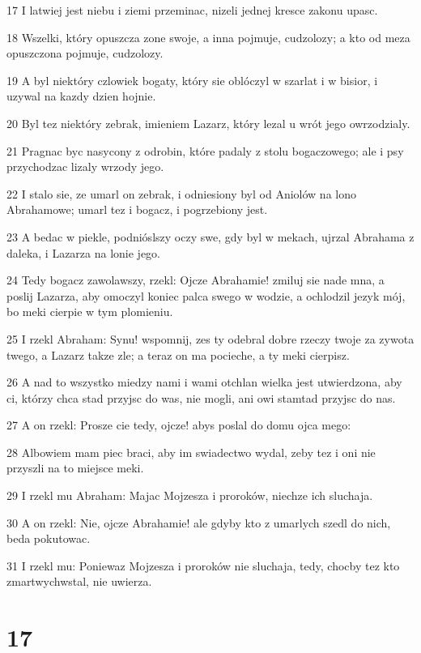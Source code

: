 \par 17 I latwiej jest niebu i ziemi przeminac, nizeli jednej kresce zakonu upasc.
\par 18 Wszelki, który opuszcza zone swoje, a inna pojmuje, cudzolozy; a kto od meza opuszczona pojmuje, cudzolozy.
\par 19 A byl niektóry czlowiek bogaty, który sie oblóczyl w szarlat i w bisior, i uzywal na kazdy dzien hojnie.
\par 20 Byl tez niektóry zebrak, imieniem Lazarz, który lezal u wrót jego owrzodzialy.
\par 21 Pragnac byc nasycony z odrobin, które padaly z stolu bogaczowego; ale i psy przychodzac lizaly wrzody jego.
\par 22 I stalo sie, ze umarl on zebrak, i odniesiony byl od Aniolów na lono Abrahamowe; umarl tez i bogacz, i pogrzebiony jest.
\par 23 A bedac w piekle, podnióslszy oczy swe, gdy byl w mekach, ujrzal Abrahama z daleka, i Lazarza na lonie jego.
\par 24 Tedy bogacz zawolawszy, rzekl: Ojcze Abrahamie! zmiluj sie nade mna, a poslij Lazarza, aby omoczyl koniec palca swego w wodzie, a ochlodzil jezyk mój, bo meki cierpie w tym plomieniu.
\par 25 I rzekl Abraham: Synu! wspomnij, zes ty odebral dobre rzeczy twoje za zywota twego, a Lazarz takze zle; a teraz on ma pocieche, a ty meki cierpisz.
\par 26 A nad to wszystko miedzy nami i wami otchlan wielka jest utwierdzona, aby ci, którzy chca stad przyjsc do was, nie mogli, ani owi stamtad przyjsc do nas.
\par 27 A on rzekl: Prosze cie tedy, ojcze! abys poslal do domu ojca mego:
\par 28 Albowiem mam piec braci, aby im swiadectwo wydal, zeby tez i oni nie przyszli na to miejsce meki.
\par 29 I rzekl mu Abraham: Majac Mojzesza i proroków, niechze ich sluchaja.
\par 30 A on rzekl: Nie, ojcze Abrahamie! ale gdyby kto z umarlych szedl do nich, beda pokutowac.
\par 31 I rzekl mu: Poniewaz Mojzesza i proroków nie sluchaja, tedy, chocby tez kto zmartwychwstal, nie uwierza.

\chapter{17}

